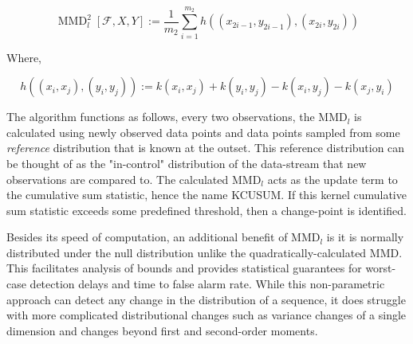 $$\operatorname{MMD}_{l}^{2}[\mathcal{F}, X, Y] :=\frac{1}{m_{2}} \sum_{i=1}^{m_{2}} h\left(\left(x_{2 i-1}, y_{2 i-1}\right),\left(x_{2 i}, y_{2 i}\right)\right)$$

Where,

$$h\left((x_i, x_j), (y_i, y_j)\right):=k\left(x_{i}, x_{j}\right)+k\left(y_{i}, y_{j}\right)-k\left(x_{i}, y_{j}\right)-k\left(x_{j}, y_{i}\right)$$

The algorithm functions as follows, every two observations, the MMD$_l$ is calculated using newly observed data points and data points sampled from some \textit{reference} distribution that is known at the outset. This reference distribution can be thought of as the "in-control" distribution of the data-stream that new observations are compared to. The calculated MMD$_l$ acts as the update term to the cumulative sum statistic, hence the name KCUSUM. If this kernel cumulative sum statistic exceeds some predefined threshold, then a change-point is identified. 

Besides its speed of computation, an additional benefit of MMD$_l$ is it is normally distributed under the null distribution unlike the quadratically-calculated MMD. This facilitates analysis of bounds and provides statistical guarantees for worst-case detection delays and time to false alarm rate. While this non-parametric approach can detect any change in the distribution of a sequence, it does struggle with more complicated distributional changes such as variance changes of a single dimension and changes beyond first and second-order moments.

